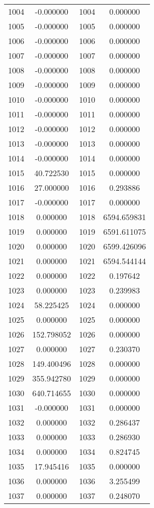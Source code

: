 \documentclass[12pt]{article}
\begin{document}
\begin{longtable}{@{}cccc@{}}
1004 & -0.000000 & 1004 & 0.000000 \\
1005 & -0.000000 & 1005 & 0.000000 \\
1006 & -0.000000 & 1006 & 0.000000 \\
1007 & -0.000000 & 1007 & 0.000000 \\
1008 & -0.000000 & 1008 & 0.000000 \\
1009 & -0.000000 & 1009 & 0.000000 \\
1010 & -0.000000 & 1010 & 0.000000 \\
1011 & -0.000000 & 1011 & 0.000000 \\
1012 & -0.000000 & 1012 & 0.000000 \\
1013 & -0.000000 & 1013 & 0.000000 \\
1014 & -0.000000 & 1014 & 0.000000 \\
1015 & 40.722530 & 1015 & 0.000000 \\
1016 & 27.000000 & 1016 & 0.293886 \\
1017 & -0.000000 & 1017 & 0.000000 \\
1018 & 0.000000 & 1018 & 6594.659831 \\
1019 & 0.000000 & 1019 & 6591.611075 \\
1020 & 0.000000 & 1020 & 6599.426096 \\
1021 & 0.000000 & 1021 & 6594.544144 \\
1022 & 0.000000 & 1022 & 0.197642 \\
1023 & 0.000000 & 1023 & 0.239983 \\
1024 & 58.225425 & 1024 & 0.000000 \\
1025 & 0.000000 & 1025 & 0.000000 \\
1026 & 152.798052 & 1026 & 0.000000 \\
1027 & 0.000000 & 1027 & 0.230370 \\
1028 & 149.400496 & 1028 & 0.000000 \\
1029 & 355.942780 & 1029 & 0.000000 \\
1030 & 640.714655 & 1030 & 0.000000 \\
1031 & -0.000000 & 1031 & 0.000000 \\
1032 & 0.000000 & 1032 & 0.286437 \\
1033 & 0.000000 & 1033 & 0.286930 \\
1034 & 0.000000 & 1034 & 0.824745 \\
1035 & 17.945416 & 1035 & 0.000000 \\
1036 & 0.000000 & 1036 & 3.255499 \\
1037 & 0.000000 & 1037 & 0.248070 \\

\end{longtable}
\end{document}
